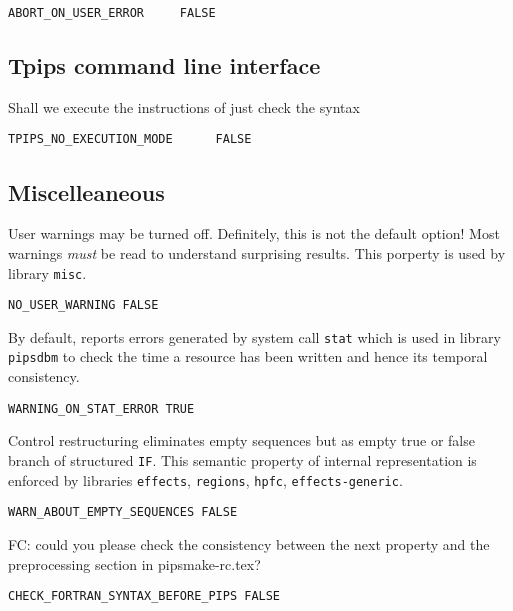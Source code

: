 \begin{verbatim}
ABORT_ON_USER_ERROR     FALSE
\end{verbatim}

\subsection{Tpips command line interface}

Shall we execute the instructions of just check the syntax

\begin{verbatim}
TPIPS_NO_EXECUTION_MODE      FALSE
\end{verbatim}


\subsection{Miscelleaneous}

User warnings may be turned off. Definitely, this is not the default
option! Most warnings {\em must} be read to understand surprising results.
This porperty is used by library \verb/misc/.

\begin{verbatim}
NO_USER_WARNING FALSE
\end{verbatim}

By default, \PIPS{} reports errors generated by system call \verb/stat/
which is used in library \verb/pipsdbm/ to check the time a resource has
been written and hence its temporal consistency.

\begin{verbatim}
WARNING_ON_STAT_ERROR TRUE
\end{verbatim}

Control restructuring eliminates empty sequences but as empty true or
false branch of structured \verb/IF/. This semantic property of \PIPS{}
internal representation is enforced by libraries \verb/effects/,
\verb/regions/, \verb/hpfc/, \verb/effects-generic/.

\begin{verbatim}
WARN_ABOUT_EMPTY_SEQUENCES FALSE
\end{verbatim}

FC: could you please check the consistency between the next property and the
preprocessing section in pipsmake-rc.tex?

\begin{verbatim}
CHECK_FORTRAN_SYNTAX_BEFORE_PIPS FALSE
\end{verbatim}

